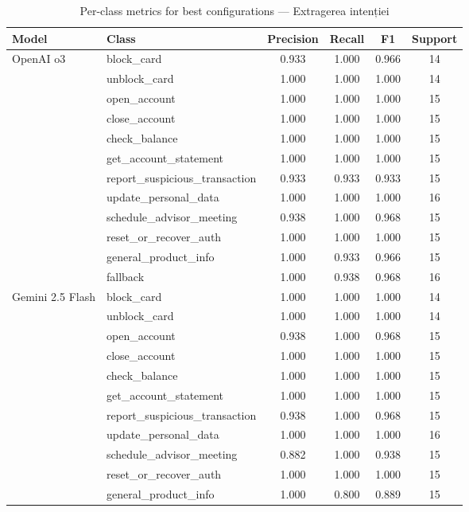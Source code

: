 \begin{table}[H]
\centering
\footnotesize
\caption{Per-class metrics for best configurations — Extragerea intenției}
\label{tab:per-class-intent-extraction}
\begin{tabular}{llcccc}
\toprule
\textbf{Model} & \textbf{Class} & \textbf{Precision} & \textbf{Recall} & \textbf{F1} & \textbf{Support} \\
\midrule
OpenAI o3 & block\_card & 0.933 & 1.000 & 0.966 & 14 \\
 & unblock\_card & 1.000 & 1.000 & 1.000 & 14 \\
 & open\_account & 1.000 & 1.000 & 1.000 & 15 \\
 & close\_account & 1.000 & 1.000 & 1.000 & 15 \\
 & check\_balance & 1.000 & 1.000 & 1.000 & 15 \\
 & get\_account\_statement & 1.000 & 1.000 & 1.000 & 15 \\
 & report\_suspicious\_transaction & 0.933 & 0.933 & 0.933 & 15 \\
 & update\_personal\_data & 1.000 & 1.000 & 1.000 & 16 \\
 & schedule\_advisor\_meeting & 0.938 & 1.000 & 0.968 & 15 \\
 & reset\_or\_recover\_auth & 1.000 & 1.000 & 1.000 & 15 \\
 & general\_product\_info & 1.000 & 0.933 & 0.966 & 15 \\
 & fallback & 1.000 & 0.938 & 0.968 & 16 \\
\midrule
Gemini 2.5 Flash & block\_card & 1.000 & 1.000 & 1.000 & 14 \\
 & unblock\_card & 1.000 & 1.000 & 1.000 & 14 \\
 & open\_account & 0.938 & 1.000 & 0.968 & 15 \\
 & close\_account & 1.000 & 1.000 & 1.000 & 15 \\
 & check\_balance & 1.000 & 1.000 & 1.000 & 15 \\
 & get\_account\_statement & 1.000 & 1.000 & 1.000 & 15 \\
 & report\_suspicious\_transaction & 0.938 & 1.000 & 0.968 & 15 \\
 & update\_personal\_data & 1.000 & 1.000 & 1.000 & 16 \\
 & schedule\_advisor\_meeting & 0.882 & 1.000 & 0.938 & 15 \\
 & reset\_or\_recover\_auth & 1.000 & 1.000 & 1.000 & 15 \\
 & general\_product\_info & 1.000 & 0.800 & 0.889 & 15 \\

\end{tabular}
\end{table}
